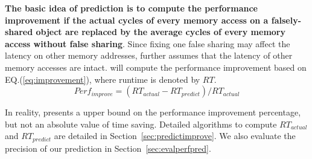 {\bf The basic idea of prediction is to compute the performance improvement if the actual cycles of every memory access on a
falsely-shared object are replaced by the average cycles of every memory access without false sharing}. Since fixing one false sharing may affect the latency on other memory addresses, \cheetah{} further assumes that the latency of other memory accesses are intact. \cheetah{} will compute the performance improvement based on EQ.(\ref{eq:improvement}), where runtime is denoted by $RT$. 
\begin{equation}
\label{eq:improvement}
Perf_{improve}=(RT_{actual} - RT_{predict})/RT_{actual}
\end{equation} 


In reality, \Cheetah{} presents a upper bound on the performance improvement percentage, but not an absolute value of time saving. 
Detailed algorithms to compute $RT_{actual}$ and $RT_{predict}$ are detailed in Section~\ref{sec:predictimprove}. We also evaluate the precision of our prediction in Section~\ref{sec:evalperfpred}.


